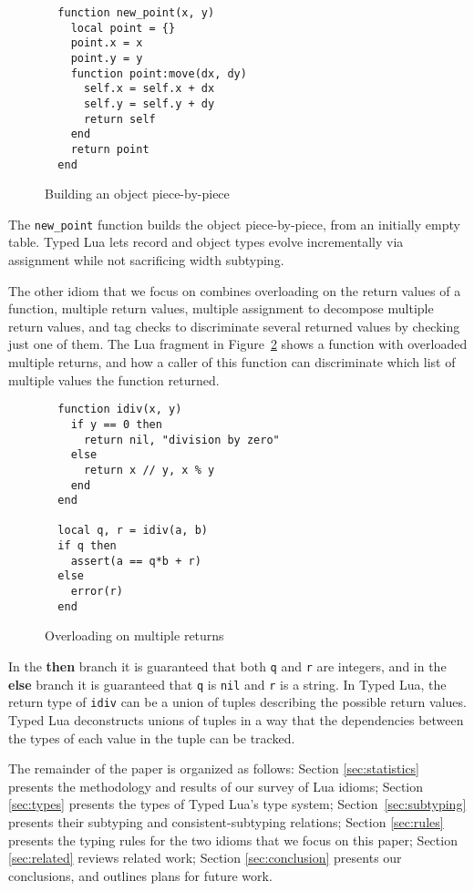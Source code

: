 \documentclass[10pt]{sigplanconf}
\begin{document}
\begin{figure}[t]
{\footnotesize
\begin{verbatim}
  function new_point(x, y)
    local point = {}
    point.x = x
    point.y = y
    function point:move(dx, dy)
      self.x = self.x + dx
      self.y = self.y + dy
      return self
    end
    return point
  end
\end{verbatim}
}
\caption{Building an object piece-by-piece}
\label{fig:newpoint}
\end{figure}

The {\tt new\_point} function builds the object piece-by-piece,
from an initially empty table. Typed Lua
lets record and object types evolve incrementally 
via assignment while not sacrificing width subtyping.

The other idiom that we focus on combines overloading on the return values of a function, multiple return values, multiple assignment
to decompose multiple return values,
and tag checks to discriminate several returned values
by checking just one of them. The Lua fragment in Figure~\ref{fig:over} shows a function with overloaded multiple
returns, and how a caller of this function can discriminate
which list of multiple values the function returned.

\begin{figure}[t]
{\footnotesize
\begin{verbatim}
  function idiv(x, y)
    if y == 0 then
      return nil, "division by zero"
    else
      return x // y, x % y
    end 
  end
  
  local q, r = idiv(a, b)
  if q then
    assert(a == q*b + r)
  else
    error(r)
  end
\end{verbatim}
}
\caption{Overloading on multiple returns}
\label{fig:over}
\end{figure}

In the {\bf then} branch it is guaranteed that both {\tt q}
and {\tt r} are integers, and in the {\bf else} branch it is
guaranteed that {\tt q} is {\tt nil} and {\tt r} is a string.
In Typed Lua, the return type of {\tt idiv} can be a union of
tuples describing the possible return values. Typed Lua deconstructs unions of tuples in a way that the dependencies between the types of each value in the tuple can be tracked.

The remainder of the paper is organized as follows:
Section \ref{sec:statistics} presents the methodology and results of
our survey of Lua idioms;
Section \ref{sec:types} presents the types of Typed Lua's
type system; Section~\ref{sec:subtyping} presents
their subtyping and consistent-subtyping relations;
Section \ref{sec:rules} presents the typing rules
for the two idioms that we focus on this paper;
Section \ref{sec:related} reviews related work;
Section \ref{sec:conclusion} presents our conclusions,
and outlines plans for future work.
\end{document}
